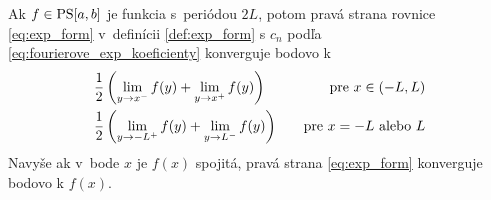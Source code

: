 \begin{veta}
    Ak $f \in \mbox{PS}[a,b]$ je funkcia s~periódou $2L$, potom 
    pravá strana rovnice 
    \eqref{eq:exp_form} v~definícii \ref{def:exp_form} s $c_n$ podľa 
    \eqref{eq:fourierove_exp_koeficienty} konverguje
    bodovo k
    \begin{align*}
        &\frac{1}{2}\left( \lim_{y\rightarrow x^-} f(y) +
                \lim_{y\rightarrow x^+} f(y)\right) \quad &\mbox{pre\ }
                x\in(-L,L) \\
        &\frac{1}{2}\left( \lim_{y\rightarrow -L^+} f(y) +
                \lim_{y\rightarrow L^-} f(y)\right) \quad &\mbox{pre\ }
                x=-L \mbox{\ alebo\ } L            
    \end{align*}
    Navyše ak v~bode $x$ je $f(x)$ spojitá, pravá strana \eqref{eq:exp_form} 
    konverguje bodovo k $f(x)$.
    \label{veta:fourierova_veta}
\end{veta}

